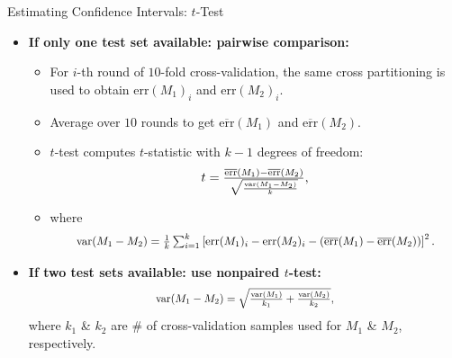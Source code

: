 \begin{frame}{Estimating Confidence Intervals: $t$-Test}
	\begin{itemize}
		\item \textbf{If only one test set available: pairwise comparison:}
		      \begin{itemize}
			      \item For $i$-th round of $10$-fold cross-validation, the same cross partitioning is used to obtain $\text{err}(M_1)_i$ and $\text{err}(M_2)_i$.
			      \item Average over $10$ rounds to get $\overline{\text{err}}(M_1)$ and $\overline{\text{err}}(M_2)$.
			      \item $t$-test computes $t$-statistic with $k-1$ degrees of freedom:
			            \begin{align}
				            \resizebox{3cm}{!}{%
					            $t = \frac{\overline{\text{err}}(M_1)- \overline{\text{err}}(M_2)}{\sqrt{\frac{\text{var}(M_1-M_2)}{k}}},$}
			            \end{align}
			      \item where
			            \begin{align}
				            \resizebox{10cm}{!}{%
					            $\text{var}(M_1-M_2) = \frac{1}{k} \sum_{i=1}^{k} \left[ \text{err}(M_1)_i - \text{err}(M_2)_i - (\overline{\text{err}}(M_1) - \overline{\text{err}}(M_2))\right]^2.$}
			            \end{align}
		      \end{itemize}
		\item \textbf{If two test sets available: use nonpaired $t$-test:}
		      \begin{align}
			      \resizebox{5cm}{!}{%
				      $\text{var}(M_1-M_2) = \sqrt{\frac{\text{var}(M_1)}{k_1} + \frac{\text{var}(M_2)}{k_2}},$}
		      \end{align}
		      where $k_1$ \& $k_2$ are $\#$ of cross-validation samples used for $M_1$ \& $M_2$, respectively.
	\end{itemize}
\end{frame}

